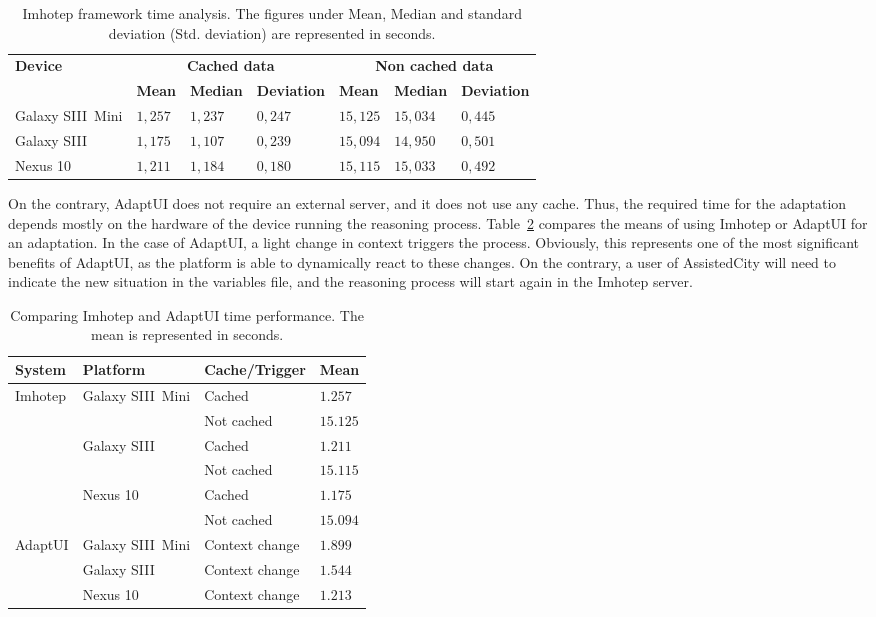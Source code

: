 \begin{table}[H]
 \caption{Imhotep framework time analysis. The figures under Mean, Median and
 standard deviation (Std. deviation) are represented in seconds.}
 \label{tbl:imhotep_timing}
 \footnotesize
 \centering
\begin{tabular}{l l l l l l l}
  \hline 
  \textbf{Device} & \multicolumn{3}{c}{\textbf{Cached 
  data}} & \multicolumn{3}{c}{\textbf{Non cached data}}\\
  & \textbf{Mean} & \textbf{Median} & \textbf{Deviation} &  \textbf{Mean} 
  & \textbf{Median} & \textbf{Deviation}\\
  \hline    
  Galaxy SIII~Mini & $1,257$ & $1,237$ & $0,247$ & $15,125$ & $15,034$ & 
$0,445$ \\
%   
  Galaxy SIII & $1,175$ & $1,107$ & $0,239$ & $15,094$ & $14,950$ & $0,501$ \\
%   
  Nexus 10 & $1,211$ & $1,184$ & $0,180$ & $15,115$ & $15,033$ & $0,492$ \\
 \hline
\end{tabular}
\end{table}

On the contrary, AdaptUI does not require an external server, and it does not 
use any cache. Thus, the required time for the adaptation depends mostly on the 
hardware of the device running the reasoning process. Table~\ref{tbl:imhotep_vs_adaptui}
compares the means of using Imhotep or AdaptUI for an adaptation. In the case of 
AdaptUI, a light change in context triggers the process. Obviously, this represents
one of the most significant benefits of AdaptUI, as the platform is able to 
dynamically react to these changes. On the contrary, a user of AssistedCity will
need to indicate the new situation in the variables file, and the reasoning process
will start again in the Imhotep server.

\begin{table}[H]
 \caption{Comparing Imhotep and AdaptUI time performance. The mean is 
represented in seconds.}
 \label{tbl:imhotep_vs_adaptui}
 \footnotesize
 \centering
\begin{tabular}{l l l l}
  \hline 
  \textbf{System} & \textbf{Platform} & \textbf{Cache/Trigger} & \textbf{Mean}\\
  \hline
  Imhotep 	& Galaxy SIII~Mini	& Cached		& $1.257$\\
		&  			& Not cached		& $15.125$\\
		& Galaxy SIII 		& Cached		& $1.211$\\
		&  			& Not cached		& $15.115$\\
		& Nexus 10 		& Cached		& $1.175$\\
		&  			& Not cached		& $15.094$\\
  \hline
  AdaptUI 	& Galaxy SIII~Mini	& Context change	& $1.899$\\
		& Galaxy SIII		& Context change	& $1.544$\\
 		& Nexus 10 		& Context change	& $1.213$\\
  \hline
\end{tabular}
\end{table}

